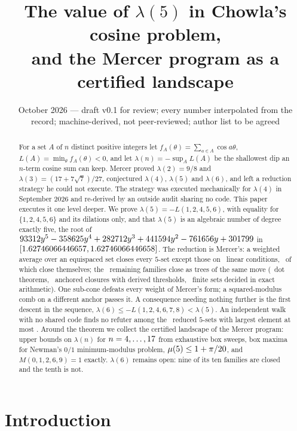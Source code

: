\documentclass[11pt]{article}
\title{The value of $\lambda(5)$ in Chowla's cosine problem,\\ and the Mercer program as a certified landscape}
\author{\cmauthor}
\date{October 2026 --- draft v0.1 for review; every number interpolated from the record; machine-derived, not peer-reviewed; author list to be agreed}
\newcommand{\Lf}{L(1,2,4,5,6)}
\newcommand{\Ls}{L(1,2,4,6,7,8)}
\begin{document}
\maketitle

\begin{abstract}
For a set $A$ of $n$ distinct positive integers let $f_A(\theta)=\sum_{a\in A}\cos a\theta$, $L(A)=\min_\theta f_A(\theta)<0$, and let $\lambda(n)=-\sup_A L(A)$ be the shallowest dip an $n$-term cosine sum can keep. Mercer proved $\lambda(2)=9/8$ and $\lambda(3)=(17+7\sqrt7)/27$, conjectured $\lambda(4)$, $\lambda(5)$ and $\lambda(6)$, and left a reduction strategy he could not execute. The strategy was executed mechanically for $\lambda(4)$ in September 2026 and re-derived by an outside audit sharing no code. This paper executes it one level deeper. We prove $\lambda(5)=-\Lf$, with equality for $\{1,2,4,5,6\}$ and its dilations only, and that $\lambda(5)$ is an algebraic number of degree exactly five, the root of $93312y^{5} - 358625y^{4} + 282712y^{3} + 441594y^{2} - 761656y + 301799$ in $[1.62746066446657,1.62746066446658]$. The reduction is Mercer's: a weighted average over an equispaced set closes every $5$-set except those on \GenConditions\ linear conditions, \GenNegative\ of which close themselves; the \GenPositive\ remaining families close as trees of the same move (\FamDots\ dot theorems, \FamClosures\ anchored closures with derived thresholds, \FamSets\ finite sets decided in exact arithmetic). One sub-cone defeats every weight of Mercer's form; a squared-modulus comb on a different anchor passes it. A consequence needing nothing further is the first descent in the sequence, $\lambda(6)\le-\Ls<\lambda(5)$. An independent walk with no shared code finds no refuter among the \AudSets\ reduced $5$-sets with largest element at most \AudBox. Around the theorem we collect the certified landscape of the Mercer program: upper bounds on $\lambda(n)$ for $n=4,\dots,17$ from exhaustive box sweeps, box maxima for Newman's $0/1$ minimum-modulus problem, $\mu(5)\le1+\pi/20$, and $M(0,1,2,6,9)=1$ exactly. $\lambda(6)$ remains open: nine of its ten families are closed and the tenth is not.
\end{abstract}

\section{Introduction}
\end{document}
